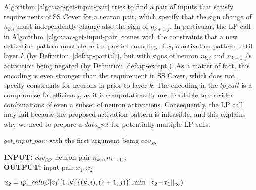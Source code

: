 \documentclass[runningheads,a4paper]{llncs}
\newcommand{\distance}[2]{ ||#1||_{#2}}
\newcommand{\covered}[3]{cov_{#1}^{#2}#3}
\begin{document}
Algorithm \ref{algo:aac-get-input-pair} tries to find a pair of inputs that
satisfy requirements of SS Cover for a neuron pair, which specify that
the sign change of $n_{k,i}$ must independently change also the sign of
$n_{k+1,j}$.  In particular, the LP call in
Algorithm~\ref{algo:aac-get-input-pair} comes with the constraints that a
new activation pattern must share the partial encoding of $x_1$'s activation
pattern until layer $k$ (by Definition~\ref{def:ap-partial}), but with signs
of neuron $n_{k,i}$ and $n_{k+1,j}$'s activation being negated (by
Definition \ref{def:ap-except}).  As a matter of fact, this encoding is even
stronger than the requirement in SS Cover, which does not
specify constraints for neurons in prior to layer $k$.  The encoding in the
$lp\_call$ is a compromise for efficiency, as it is computationally
un-affordable to consider combinations of even a subset of neuron
activations.  Consequently, the LP call may fail because the proposed
activation pattern is infeasible, and this explains why we need to prepare a
$data\_set$ for potentially multiple LP calls.

\begin{algorithm}[!htp]
  \caption{$get\_input\_pair$ with the first argument being $\covered{SS}{}{}$}
  \label{algo:aac-get-input-pair}
  \begin{flushleft}
    \textbf{INPUT:} $\covered{SS}{}{}$, neuron pair $n_{k,i},n_{k+1,j}$\\
    \textbf{OUTPUT:} input pair $x_1, x_2$
  \end{flushleft}
  \begin{algorithmic}[1]
    \State $x_2=lp\_call(\constraints[x_1][1..k][\{(k,i), (k+1,j)\}], \min{\distance{x_2\!-\!x_1}{\infty}})$
       

      \EndIf
    \EndFor
    \State \Return{\_, \_}
  \end{algorithmic}
\end{algorithm}%
\end{document}
